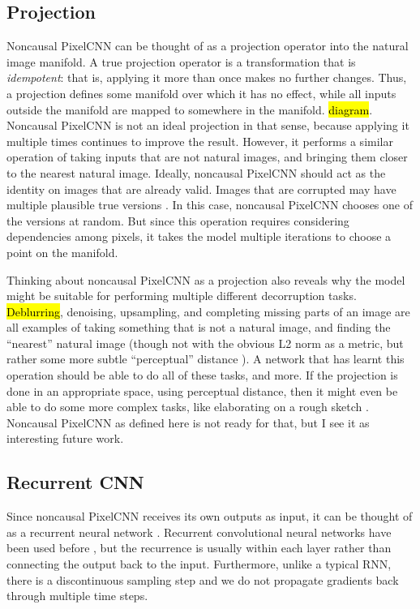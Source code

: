 \documentclass[10pt,a4paper]{article}
\newcommand{\nquote}[1]{``{#1}''}
\begin{document}
\subsection{Projection}

Noncausal PixelCNN can be thought of as a projection operator into the natural image manifold. A true projection operator \cite{??} is a transformation that is \emph{idempotent}: that is, applying it more than once makes no further changes. Thus, a projection defines some manifold over which it has no effect, while all inputs outside the manifold are mapped to somewhere in the manifold. \hl{diagram}. Noncausal PixelCNN is not an ideal projection in that sense, because applying it multiple times continues to improve the result. However, it performs a similar operation of taking inputs that are not natural images, and bringing them closer to the nearest natural image. Ideally, noncausal PixelCNN should act as the identity on images that are already valid. Images that are corrupted may have multiple plausible true versions \cite{??}. In this case, noncausal PixelCNN chooses one of the versions at random. But since this operation requires considering dependencies among pixels, it takes the model multiple iterations to choose a point on the manifold.

Thinking about noncausal PixelCNN as a projection also reveals why the model might be suitable for performing multiple different decorruption tasks. \hl{Deblurring}, denoising, upsampling, and completing missing parts of an image are all examples of taking something that is not a natural image, and finding the \nquote{nearest} natural image (though not with the obvious L2 norm as a metric, but rather some more subtle \nquote{perceptual} distance \cite{??}). A network that has learnt this operation should be able to do all of these tasks, and more. If the projection is done in an appropriate space, using perceptual distance, then it might even be able to do some more complex tasks, like elaborating on a rough sketch \cite{??}. Noncausal PixelCNN as defined here is not ready for that, but I see it as interesting future work.

\subsection{Recurrent CNN}

Since noncausal PixelCNN receives its own outputs as input, it can be thought of as a recurrent neural network \cite{??}. Recurrent convolutional neural networks have been used before \cite{??,??}, but the recurrence is usually within each layer rather than connecting the output back to the input. Furthermore, unlike a typical RNN, there is a discontinuous sampling step and we do not propagate gradients back through multiple time steps.
\end{document}

